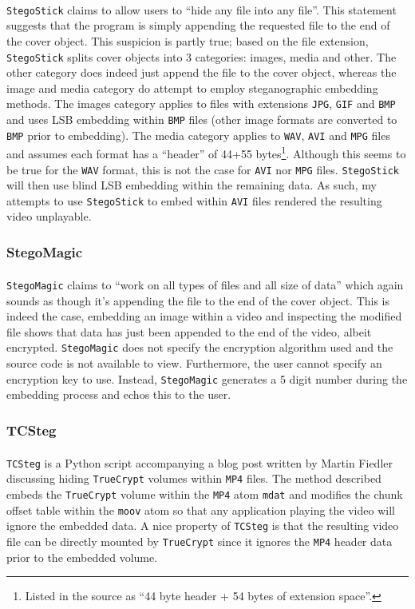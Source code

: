 \documentclass[paper=a4, fontsize=11pt,twoside]{scrartcl}
\numberwithin{table}{section}
\numberwithin{figure}{section}
\numberwithin{algorithm}{section}
\begin{document}
\texttt{StegoStick}\textsuperscript{\cite{stegostick}} claims to allow users to ``hide any file into any file''. This statement suggests that the program is simply appending the requested file to the end of the cover object. This suspicion is partly true; based on the file extension, \texttt{StegoStick} splits cover objects into 3 categories: images, media and other. The other category does indeed just append the file to the cover object, whereas the image and media category do attempt to employ steganographic embedding methods. The images category applies to files with extensions \texttt{JPG}, \texttt{GIF} and \texttt{BMP} and uses LSB embedding within \texttt{BMP} files (other image formats are converted to \texttt{BMP} prior to embedding). The media category applies to \texttt{WAV}, \texttt{AVI} and \texttt{MPG} files and assumes each format has a ``header'' of 44+55 bytes\footnote{Listed in the source as ``44 byte header + 54 bytes of extension space''.}. Although this seems to be true for the \texttt{WAV} format, this is not the case for \texttt{AVI} nor \texttt{MPG} files. \texttt{StegoStick} will then use blind LSB embedding within the remaining data. As such, my attempts to use \texttt{StegoStick} to embed within \texttt{AVI} files rendered the resulting video unplayable. %

\subsubsection{StegoMagic}

\texttt{StegoMagic}\textsuperscript{\cite{stegomagic}} claims to ``work on all types of files and all size of data'' which again sounds as though it's appending the file to the end of the cover object. This is indeed the case, embedding an image within a video and inspecting the modified file shows that data has just been appended to the end of the video, albeit encrypted. \texttt{StegoMagic} does not specify the encryption algorithm used and the source code is not available to view. Furthermore, the user cannot specify an encryption key to use. Instead, \texttt{StegoMagic} generates a 5 digit number during the embedding process and echos this to the user.  

\subsubsection{TCSteg}

\texttt{TCSteg}\textsuperscript{\cite{tcsteg}} is a Python script accompanying a blog post written by Martin Fiedler discussing hiding \texttt{TrueCrypt} volumes within \texttt{MP4} files. The method described embeds the \texttt{TrueCrypt} volume within the \texttt{MP4} atom \texttt{mdat} and modifies the chunk offset table within the \texttt{moov} atom so that any application playing the video will ignore the embedded data. A nice property of \texttt{TCSteg} is that the resulting video file can be directly mounted by \texttt{TrueCrypt} since it ignores the \texttt{MP4} header data prior to the embedded volume.\\
\end{document}
